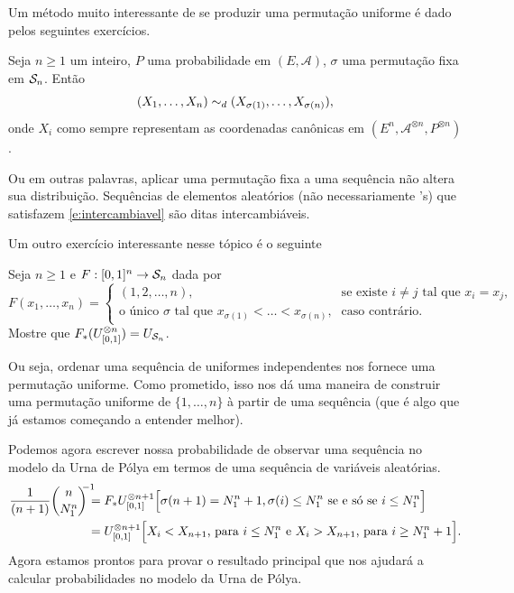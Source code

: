 \begin{topics}
Um método muito interessante de se produzir uma permutação uniforme é dado pelos seguintes exercícios.

\begin{exercise}
  Seja $n \geq 1$ um inteiro, $P$ uma probabilidade em $(E, \mathcal{A})$, $\sigma$ uma permutação fixa em ${\mathcal S}_n$.
  Então
  \begin{equation}
    \label{e:intercambiavel}
    (X_1, \dots, X_n) \sim_d (X_{\sigma(1)}, \dots, X_{\sigma(n)}),
  \end{equation}
  onde $X_i$ como sempre representam as coordenadas canônicas em $(E^{n}, \mathcal{A}^{\otimes n}, P^{\otimes n})$.
\end{exercise}

Ou em outras palavras, aplicar uma permutação fixa a uma sequência \iid não altera sua distribuição.
Sequências de elementos aleatórios (não necessariamente \iid's) que satisfazem \eqref{e:intercambiavel} são ditas intercambiáveis. 

Um outro exercício interessante nesse tópico é o seguinte
\begin{exercise}
  Seja $n \geq 1$ e $F:[0,1]^n \to {\ensuremath{\mathcal S}}_n$ dada por
  \begin{equation*}
    F(x_1, \dots, x_n) =
    \begin{cases}
      (1, 2, \dots, n), \quad & \text{se existe $i \neq j$ tal que $x_i = x_j$, }\\
      \text{o único $\sigma$ tal que $x_{\sigma(1)} < \dots < x_{\sigma(n)}$,} & \text{caso contrário.}
    \end{cases}
  \end{equation*}
  Mostre que $F_*(U_{[0,1]}^{\otimes n}) = U_{{\mathcal S}_n}$.
\end{exercise}

Ou seja, ordenar uma sequência de uniformes independentes nos fornece uma permutação uniforme.
Como prometido, isso nos dá uma maneira de construir uma permutação uniforme de $\{1, \dots, n\}$ à partir de uma sequência \iid (que é algo que já estamos começando a entender melhor).

Podemos agora escrever nossa probabilidade de observar uma sequência no modelo da
Urna de Pólya em termos de uma sequência \iid de variáveis aleatórias.
\begin{equation*}
  \begin{split}
    \frac{1}{(n+1)} \binom{n}{N^n_1}^{\mathclap{\;-1}} & =
    F_{*} U_{[0,1]}^{\otimes n+1} \Big[ \sigma(n+1) = N^n_1 + 1, \sigma(i) \leq N^n_1 \text{ se e só se } i \leq N^n_1 \Big]\\
    & =  U^{\otimes n+1}_{[0,1]} \Big[ \text{$X_i < X_{n+1}$, para $i \leq N^n_1$ e $X_i > X_{n+1}$, para $i \ge N^n_1+1$} \Big].
  \end{split}
\end{equation*}
Agora estamos prontos para provar o resultado principal que nos ajudará a calcular probabilidades no modelo da Urna de Pólya.


\end{topics}
